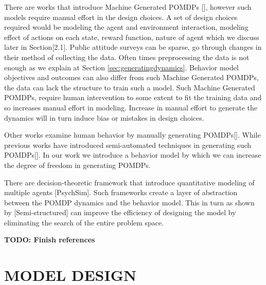 There are works that introduce Machine Generated POMDPs [], however such models require manual effort in the design choices. A set of design choices required would be modeling the agent and environment interaction, modeling effect of actions on each state, reward function, nature of agent which we discuss later in Section[2.1]. Public attitude surveys can be sparse, go through changes in their method of collecting the data. Often times preprocessing the data is not enough as we explain at Section \ref{sec:generatingdynamics}. Behavior model objectives and outcomes can also differ from such Machine Generated POMDPs, the data can lack the structure to train such a model. Such Machine Generated POMDPs, require human intervention to some extent to fit the training data and so increases manual effort in modeling. Increase in manual effort to generate the dynamics will in turn induce bias or mistakes in design choices.


Other works examine human behavior by manually generating POMDPs[]. While previous works have introduced semi-automated techniques in generating such POMDPs[]. In our work we introduce a behavior model by which we can increase the degree of freedom in generating POMDPs. 

There are decision-theoretic framework that introduce quantitative modeling of multiple agents [PsychSim]. Such frameworks create a layer of abstraction between the POMDP dynamics and the behavior model. This in turn as shown by [Semi-structured] can improve the efficiency of designing the model by eliminating the search of the entire problem space.

\textbf{TODO: Finish references}
\section{MODEL DESIGN}

